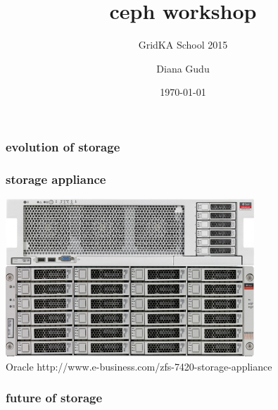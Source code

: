 \documentclass[10pt, compress]{beamer}
\title{ceph workshop}
\subtitle{GridKA School 2015}
\date{\today}
\author{Diana Gudu}
\institute[KIT]{Karlsruhe Institute of Technology}
\begin{document}
\maketitle

\begin{frame}[fragile]
  \frametitle{evolution of storage}
    \begin{center}
        
    \end{center}
\end{frame}

\begin{frame}[fragile]
  \frametitle{storage appliance}
    \begin{center}
    \includegraphics[width=0.7\textwidth]{7420_front_zoom}\\
    \fontsize{3}{3}\selectfont Oracle 
    http://www.e-business.com/zfs-7420-storage-appliance
    \end{center}
\end{frame}

\begin{frame}[fragile]
  \frametitle{future of storage}
    \begin{columns}
        
    \end{columns}
\end{frame}
\end{document}
